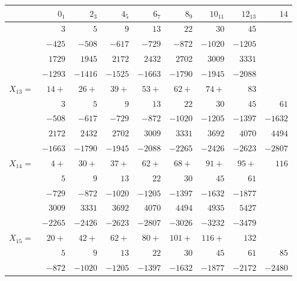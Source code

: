 \documentclass[11pt]{article}
\begin{document}
\begin{center}\small
\begin{tabular}{l|rrrrrrrr}
            & $0_{1}$ & $2_{3}$ & $4_{5}$ & $6_{7}$ & $8_{9}$ & $10_{11}$ & $12_{13}$ & $14$ \\\hline
            & $3$     & $5$     & $9$     & $13$    & $22$    & $30$      & $45$      &       \\
            & $-425$  & $-508$  & $-617$  & $-729$  & $-872$  & $-1020$   & $-1205$   &       \\
            & $1729$  & $1945$  & $2172$  & $2432$  & $2702$  & $3009$    & $3331$    &       \\
            & $-1293$ & $-1416$ & $-1525$ & $-1663$ & $-1790$ & $-1945$   & $-2088$   &       \\
$X_{13}=$   & $14+$   & $26+$   & $39+$   & $53+$   & $62+$   & $74+$     & $83$      &       \\\hline
            & $3$     & $5$     & $9$     & $13$    & $22$    & $30$      & $45$      & $61$  \\
            & $-508$  & $-617$  & $-729$  & $-872$  & $-1020$ & $-1205$   & $-1397$   & $-1632$\\
            & $2172$  & $2432$  & $2702$  & $3009$  & $3331$  & $3692$    & $4070$    & $4494$\\
            & $-1663$ & $-1790$ & $-1945$ & $-2088$ & $-2265$ & $-2426$   & $-2623$   & $-2807$\\
$X_{14}=$   & $4+$    & $30+$   & $37+$   & $62+$   & $68+$   & $91+$     & $95+$     & $116$ \\\hline
            & $5$     & $9$     & $13$    & $22$    & $30$    & $45$      & $61$      &       \\
            & $-729$  & $-872$  & $-1020$ & $-1205$ & $-1397$ & $-1632$   & $-1877$   &       \\
            & $3009$  & $3331$  & $3692$  & $4070$  & $4494$  & $4935$    & $5427$    &       \\
            & $-2265$ & $-2426$ & $-2623$ & $-2807$ & $-3026$ & $-3232$   & $-3479$   &       \\
$X_{15}=$   & $20+$   & $42+$   & $62+$   & $80+$   & $101+$  & $116+$    & $132$     &       \\\hline
            & $5$     & $9$     & $13$    & $22$    & $30$    & $45$      & $61$      & $85$  \\
            & $-872$  & $-1020$ & $-1205$ & $-1397$ & $-1632$ & $-1877$   & $-2172$   & $-2480$\\

\end{tabular}
\end{center}
\end{document}
